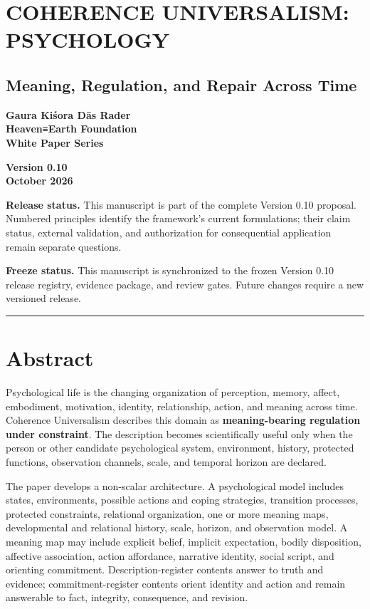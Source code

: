 \documentclass[
  11pt,
]{article}
\author{}
\date{}
\begin{document}
\section{COHERENCE UNIVERSALISM:
PSYCHOLOGY}\label{coherence-universalism-psychology}

\subsection{Meaning, Regulation, and Repair Across
Time}\label{meaning-regulation-and-repair-across-time}

\textbf{Gaura Kiśora Dās Rader}\\
\textbf{Heaven≡Earth Foundation}\\
\textbf{White Paper Series}

\textbf{Version 0.10}\\
\textbf{October 2026}

\textbf{Release status.} This manuscript is part of the complete Version
0.10 proposal. Numbered principles identify the framework's current
formulations; their claim status, external validation, and authorization
for consequential application remain separate questions.

\textbf{Freeze status.} This manuscript is synchronized to the frozen
Version 0.10 release registry, evidence package, and review gates.
Future changes require a new versioned release.

\begin{center}\rule{0.5\linewidth}{0.5pt}\end{center}

\section{Abstract}\label{abstract}

Psychological life is the changing organization of perception, memory,
affect, embodiment, motivation, identity, relationship, action, and
meaning across time. Coherence Universalism describes this domain as
\textbf{meaning-bearing regulation under constraint}. The description
becomes scientifically useful only when the person or other candidate
psychological system, environment, history, protected functions,
observation channels, scale, and temporal horizon are declared.

The paper develops a non-scalar architecture. A psychological model
includes states, environments, possible actions and coping strategies,
transition processes, protected constraints, relational organization,
one or more meaning maps, developmental and relational history, scale,
horizon, and observation model. A meaning map may include explicit
belief, implicit expectation, bodily disposition, affective association,
action affordance, narrative identity, social script, and orienting
commitment. Description-register contents answer to truth and evidence;
commitment-register contents orient identity and action and remain
answerable to fact, integrity, consequence, and revision.
\end{document}
